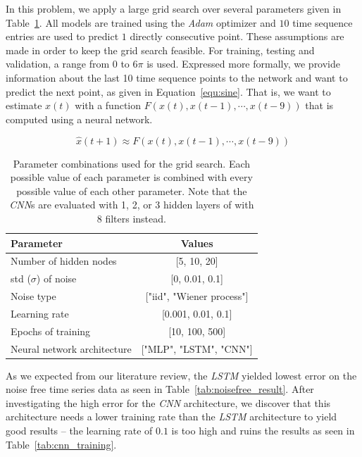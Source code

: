 \documentclass{article}
\begin{document}
In this problem, we apply a large grid search over several parameters given in
Table~\ref{tab:gridparameters}. All models are trained using the \emph{Adam}
optimizer and $10$ time sequence entries are used to predict $1$ directly
consecutive point. These assumptions are made in order to keep the grid search
feasible. For training, testing and validation, a range from $0$ to $6 \pi$ is
used. Expressed more formally,
we provide information about the last 10 time sequence points
to the network and want to predict the next point, as given in
Equation~\ref{equ:sine}. That is, we want to estimate $x(t)$ with a function
$F(x(t), x(t-1), \cdots, x(t-9))$ that is computed using a neural network.

\begin{equation}
    \hat{x} (t + 1) \approx F(x(t), x(t-1), \cdots, x(t-9))
    \label{equ:sine}
\end{equation}


\begin{table}
    \centering
    \begin{tabular}{l|c}
        Parameter                   & Values                    \\
        \hline
        Number of hidden nodes      & [5, 10, 20]               \\
        std ($\sigma$) of noise     & [0, 0.01, 0.1]            \\
        Noise type                  & ["iid", "Wiener process"] \\
        Learning rate               & [0.001, 0.01, 0.1]        \\
        Epochs of training          & [10, 100, 500]            \\
        Neural network architecture & ["MLP", "LSTM", "CNN"]    \\
    \end{tabular}
    \caption{Parameter combinations used for the grid search. Each possible value
        of each parameter is combined with every possible value of each other
        parameter. Note that the \emph{CNN}s are evaluated with 1, 2, or 3 hidden
        layers of with 8 filters instead.}
    \label{tab:gridparameters}
\end{table}

As we expected from our literature review, the \emph{LSTM} yielded lowest error
on the noise free time series data as seen in Table~\ref{tab:noisefree_result}.
After investigating the high error for the \emph{CNN} architecture, we discover
that this architecture needs a lower training rate than the \emph{LSTM}
architecture to yield good results -- the learning rate of $0.1$ is too high
and ruins the results as seen in Table~\ref{tab:cnn_training}.
\end{document}
